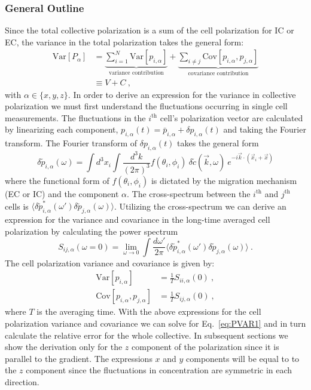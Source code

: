 \subsubsection{General Outline}
Since the total collective polarization is a sum of the cell polarization for IC or EC, the variance in the total polarization takes the general form:
\begin{equation} \label{eq:PVAR1}
\begin{split}
    \text{Var}[P_\alpha] &=
    \underbrace{\sum_{i=1}^N \text{Var}[p_{i,\alpha}]}_\text{variance contribution}
    + \underbrace{\sum_{i\neq j} \text{Cov}[p_{i,\alpha},p_{j,\alpha}]}_\text{covariance contribution} \\
    &\equiv V + C \ ,
\end{split}
\end{equation}
with $\alpha \in \{ x,y,z\}$.
In order to derive an expression for the variance in collective polarization we must first understand the fluctuations occurring in single cell measurements. The fluctuations in the $i^\text{th}$ cell's polarization vector are calculated by linearizing each component,
$p_{i,\alpha}(t) = \bar{p}_{i,\alpha} + \delta p_{i,\alpha}(t)$
and taking the Fourier transform. The Fourier transform of $\delta p_{i,\alpha}(t)$ takes the general form
\begin{equation}
    \delta\tilde{p}_{i,\alpha}(\omega) = \int d^3x_i \int \frac{d^3k}{(2\pi)^3} f(\theta_i,\phi_i) \ \delta\tilde{c}(\vec{k},\omega) \ e^{-i\vec{k}\cdot(\vec{x}_i+\vec{x})}
\end{equation}
where the functional form of $f(\theta_i,\phi_i)$ is dictated by the migration mechanism (EC or IC) and the component $\alpha$.
The cross-spectrum between the $i^\text{th}$ and $j^\text{th}$ cells is
$\langle \delta\tilde{p}_{i,\alpha}^*(\omega') \delta\tilde{p}_{j,\alpha}(\omega) \rangle$. Utilizing the cross-spectrum we can derive an expression for the variance and covariance in the long-time averaged cell polarization by calculating the power spectrum
\begin{equation} \label{eq:sij1}
    S_{ij,\alpha}(\omega=0) = \lim_{\omega \to 0} \int \frac{d\omega'}{2\pi}
    \langle \delta\tilde{p}_{i,\alpha}^*(\omega') \delta\tilde{p}_{j,\alpha}(\omega) \rangle \ .
\end{equation}
The cell polarization variance and covariance is given by:
\begin{align}
    \text{Var}[p_{i,\alpha}] &= \frac{1}{T} S_{ii,\alpha}(0) \ , \\
    \text{Cov}[p_{i,\alpha},p_{j,\alpha}] &= \frac{1}{T} S_{ij,\alpha}(0) \ ,
\end{align}
where $T$ is the averaging time.
With the above expressions for the cell polarization variance and covariance we can solve for Eq.\ \ref{eq:PVAR1} and in turn calculate the relative error for the whole collective. In subsequent sections we show the derivation only for the $z$ component of the polarization since it is parallel to the gradient. The expressions $x$ and $y$ components will be equal to to the $z$ component since the fluctuations in concentration are symmetric in each direction.



